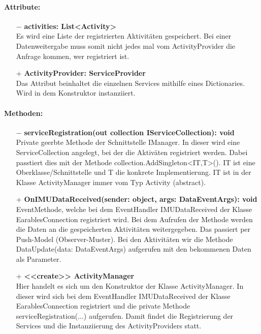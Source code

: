 \documentclass[a4paper,12pt]{article}
\begin{document}
	\paragraph{Attribute:}
	\begin{itemize}
		\item[$-$] \textbf{activities: List<Activity>}\\Es wird eine Liste der registrierten Aktivitäten gespeichert. Bei einer Datenweitergabe muss somit nicht jedes mal vom ActivityProvider die Anfrage kommen, wer registriert ist. 
		\item[+] \textbf{ActivityProvider: ServiceProvider}\\Das Attribut beinhaltet die einzelnen Services mithilfe eines Dictionaries. Wird in dem Konstruktor instanziiert.
	\end{itemize}
	\paragraph{Methoden:}
	\begin{itemize}
		\item[$-$] \textbf{serviceRegistration(out collection IServiceCollection): void}\\Private geerbte Methode der Schnittstelle IManager. In dieser wird eine ServiceCollection angelegt, bei der die Aktiväten registriert werden. Dabei passtiert dies mit der Methode collection.AddSingleton<IT,T>(). IT ist eine Oberklasse/Schnittstelle und T die konkrete Implementierung. IT ist in der Klasse ActivityManager immer vom Typ Activity (abstract).
		\item[+] \textbf{OnIMUDataReceived(sender: object, args: DataEventArgs): void}\\EventMethode, welche bei dem EventHandler IMUDataReceived der Klasse EarablesConnection registriert wird. Bei dem Aufrufen der Methode werden die Daten an die gespeicherten Aktivitäten weitergegeben. Das passiert per Push-Model (Observer-Muster). Bei den Aktivitäten wir die Methode DataUpdate(data: DataEventArgs) aufgerufen mit den bekommenen Daten als Parameter.%
		\item[+] \textbf{<<create>> ActivityManager}\\Hier handelt es sich um den Konstruktor der Klasse ActivityManager. In dieser wird sich bei dem EventHandler IMUDataReceived der Klasse EarablesConnection registriert und die private Methode serviceRegistration(...) aufgerufen. Damit findet die Registrierung der Services und die Instanziierung des ActivityProviders statt.
	\end{itemize}
	
\end{document}
